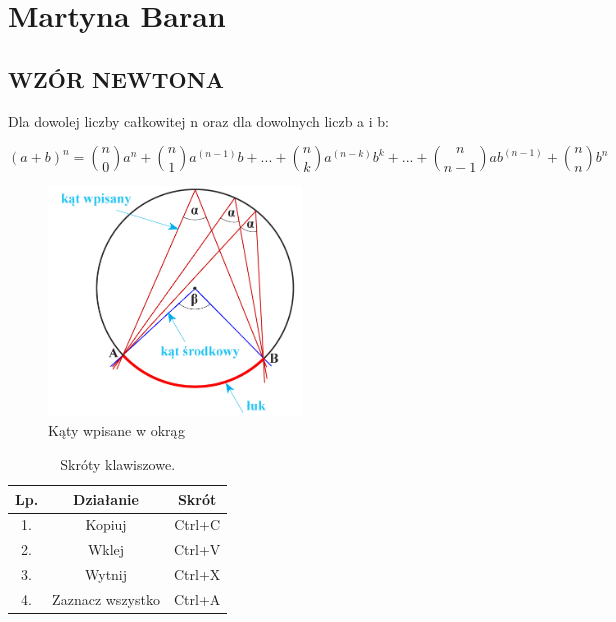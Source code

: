 \section{Martyna Baran}




\subsection{WZÓR NEWTONA} 

Dla dowolej liczby całkowitej n oraz dla dowolnych liczb a i b:

\[(a+b)^n={n \choose 0}a^n + {n \choose 1}a^{(n-1)}b + ... + {n \choose k}a^{(n-k)}b^k + ... + {n \choose n-1}ab^{(n-1)} + {n \choose n}b^n \]


\begin{figure}[htbp]
\centering
\includegraphics[width=0.6\textwidth]{pictures/katwpisany.jpg}
\caption{\label{fig: kąty wpisane}Kąty wpisane w okrąg}
\end{figure}


\begin{table}[h!]
\centering
\begin{tabular}{||c c c||} 
 \hline
 Lp. & Działanie & Skrót  \\ [0.5ex] 
 \hline\hline
 1. & Kopiuj & Ctrl+C  \\ 
 2. & Wklej & Ctrl+V  \\
 3. & Wytnij & Ctrl+X  \\
 4. & Zaznacz wszystko & Ctrl+A  \\ [1ex] 
 \hline
\end{tabular}
\caption{Skróty klawiszowe.}
\label{table:1}
\end{table}


